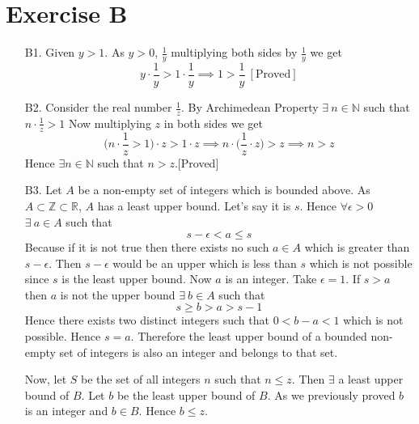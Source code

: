 \documentclass{article}
\begin{document}
	\section{Exercise B}
	\begin{enumerate}
		\item[B1.] Given $y>1$. As $y>0$, $\frac1y$ multiplying both sides by $\frac{1}{y}$ we get$$y\cdot \frac1y >1\cdot \frac1y\implies 1>\frac1y \ [\text{Proved}]$$
		\item[B2.] Consider the real number $\frac1z$. By Archimedean Property $\exists\ n\in\mathbb{N}$ such that $n\cdot \frac1z >1$ Now multiplying $z$ in both sides we get $$\bigg(n\cdot \frac1z >1\bigg)\cdot z>1\cdot z\implies n\cdot\bigg(\frac1z \cdot z\bigg)>z\implies n>z$$Hence $\exists n\in \mathbb{N}$ such that $n>z$.[Proved]
		\item[B3.] Let $A$ be a non-empty set of integers which is bounded above. As $A\subset \mathbb{Z}\subset \mathbb{R}$, $A$ has a least upper bound. Let's say it is $s$. Hence $\forall \epsilon >0$ $\exists\ a\in A$ such that $$s-\epsilon<a\leq s$$Because if it is not true then there exists no such $a\in A$ which is greater than $s-\epsilon$. Then $s-\epsilon$ would be an upper which is less than $s$ which is not possible since $s$ is the least upper bound. Now $a$ is an integer. Take $\epsilon=1$. If $s>a$ then $a$ is not the upper bound $\exists\ b\in A$ such that $$s\geq b>a>s-1$$Hence there exists two distinct integers such that $0<b-a<1$ which is not possible. Hence $s=a$. Therefore the least upper bound of a bounded non-empty set of integers is also an integer and belongs to that set.
		
		\hspace{1cm}Now, let $S$ be the set of all integers $n$ such that $n\leq z$. Then $\exists$ a least upper bound of $B$. Let $b$ be the least upper bound of $B$. As we previously proved $b$ is an integer and $b\in B.$ Hence $b\leq z$.
		

\end{enumerate}
\end{document}
